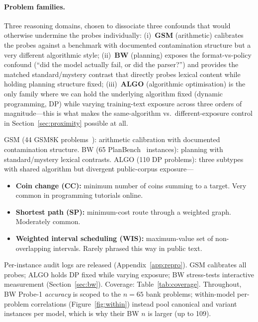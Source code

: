 \documentclass{article}
\begin{document}
\paragraph{Problem families.}
Three reasoning domains, chosen to dissociate three confounds that would
otherwise undermine the probes individually: (i)~\textbf{GSM} (arithmetic)
calibrates the probes against a benchmark with documented contamination
structure but a very different algorithmic style; (ii)~\textbf{BW} (planning)
exposes the format-vs-policy confound (``did the model actually fail, or did
the parser?'') and provides the matched standard/mystery contrast that
directly probes lexical content while holding planning structure fixed;
(iii)~\textbf{ALGO} (algorithmic optimisation) is the only family where we
can hold the underlying algorithm fixed (dynamic programming, DP) while
varying training-text exposure across three orders of magnitude---this is
what makes the same-algorithm vs.\ different-exposure control in
Section~\ref{sec:proximity} possible at all.

GSM (44 GSM8K problems~\citep{cobbe2021training}): arithmetic calibration
with documented contamination structure. BW (65
PlanBench~\citep{valmeekam2023planbench} instances): planning with
standard/mystery lexical contrasts. ALGO (110 DP problems): three subtypes
with shared algorithm but divergent public-corpus exposure---
\begin{itemize}
  \item \textbf{Coin change (CC):} minimum number of coins summing to a
  target. Very common in programming tutorials online.
  \item \textbf{Shortest path (SP):} minimum-cost route through a weighted
  graph. Moderately common.
  \item \textbf{Weighted interval scheduling (WIS):} maximum-value set of
  non-overlapping intervals. Rarely phrased this way in public text.
\end{itemize}
Per-instance audit logs are released (Appendix~\ref{app:repro}). GSM
calibrates all probes; ALGO holds DP fixed while varying exposure; BW
stress-tests interactive measurement (Section~\ref{sec:bw}). Coverage:
Table~\ref{tab:coverage}. Throughout, BW Probe-1 \emph{accuracy} is scoped to
the $n{=}65$ bank problems; within-model per-problem correlations
(Figure~\ref{fig:within}) instead pool canonical and variant instances per
model, which is why their BW $n$ is larger (up to 109).
\end{document}

